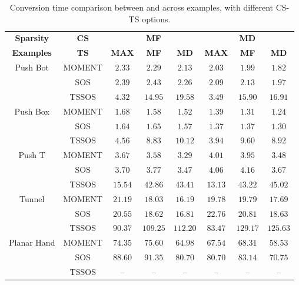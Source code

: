 \begin{table}[htbp]
    \centering
    \begin{adjustbox}{width=\linewidth}
    \begin{tabular}{|c|c|ccc|ccc|}
        \hline
        \textbf{Sparsity}& \textbf{CS} 
        & \multicolumn{3}{c|}{\textbf{MF}} 
        & \multicolumn{3}{c|}{\textbf{MD}} \\ \cline{2-8}
        \textbf{Examples} & \textbf{TS}
        & \textbf{MAX} & \textbf{MF} & \textbf{MD} 
        & \textbf{MAX} & \textbf{MF} & \textbf{MD} \\ \hline

        \multirow{3}{*}{Push Bot} 
        & MOMENT & $2.33$ & $2.29$ & $2.13$ & $2.03$ & $1.99$ & $1.82$ \\ 
        & SOS    & $2.39$ & $2.43$ & $2.26$ & $2.09$ & $2.13$ & $1.97$ \\ 
        & TSSOS  & $4.32$ & $14.95$ & $19.58$ & $3.49$ & $15.90$ & $16.91$ \\ \hline

        \multirow{3}{*}{Push Box} 
        & MOMENT & $1.68$ & $1.58$ & $1.52$ & $1.39$ & $1.31$ & $1.24$ \\ 
        & SOS    & $1.64$ & $1.65$ & $1.57$ & $1.37$ & $1.37$ & $1.30$ \\ 
        & TSSOS  & $4.56$ & $8.83$ & $10.12$ & $3.94$ & $9.60$ & $8.92$ \\ \hline

        \multirow{3}{*}{Push T} 
        & MOMENT & $3.67$ & $3.58$ & $3.29$ & $4.01$ & $3.95$ & $3.48$ \\ 
        & SOS    & $3.70$ & $3.77$ & $3.47$ & $4.06$ & $4.16$ & $3.67$ \\ 
        & TSSOS  & $15.54$ & $42.86$ & $43.41$ & $13.13$ & $43.22$ & $45.02$ \\ \hline

        \multirow{3}{*}{Tunnel} 
        & MOMENT & $21.19$ & $18.03$ & $16.19$ & $19.78$ & $19.79$ & $17.69$ \\ 
        & SOS    & $20.55$ & $18.62$ & $16.81$ & $22.76$ & $20.81$ & $18.63$ \\ 
        & TSSOS  & $90.37$ & $109.25$ & $112.20$ & $83.47$ & $129.17$ & $125.63$ \\ \hline

        \multirow{3}{*}{Planar Hand} 
        & MOMENT & $74.35$ & $75.60$ & $64.98$ & $67.54$ & $68.31$ & $58.53$ \\ 
        & SOS    & $88.60$ & $91.35$ & $80.70$ & $80.70$ & $83.14$ & $70.75$ \\ 
        & TSSOS  & -- & -- & -- & -- & -- & -- \\ \hline
    \end{tabular}
    \end{adjustbox}
    \caption{Conversion time comparison between \spot and \tssos across examples, with different CS-TS options. \label{tab:performance_comparison}}
\end{table}
